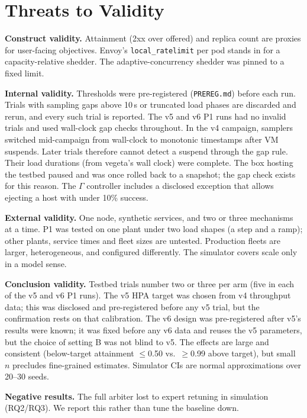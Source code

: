 \documentclass[conference]{IEEEtran}
\begin{document}
\section{Threats to Validity}
\label{sec:threats}

\textbf{Construct validity.} Attainment (2xx over offered) and replica count
are proxies for user-facing objectives. Envoy's \texttt{local\_ratelimit} per
pod stands in for a capacity-relative shedder. The adaptive-concurrency
shedder was pinned to a fixed limit.

\textbf{Internal validity.} Thresholds were pre-registered
(\texttt{PREREG.md}) before each run. Trials with sampling gaps above 10\,s or
truncated load phases are discarded and rerun, and every such
trial is reported. The v5 and v6 P1 runs had no invalid trials and used
wall-clock gap checks throughout. In the v4 campaign, samplers switched mid-campaign from
wall-clock to monotonic timestamps after VM suspends. Later trials therefore
cannot detect a suspend through the gap rule. Their load durations (from
vegeta's wall clock) were complete. The box hosting the testbed paused and was once rolled back to a
snapshot; the gap check exists for this reason. The $\Gamma$ controller
includes a disclosed exception that allows ejecting a host with under 10\%
success.

\textbf{External validity.} One node, synthetic services, and two or three
mechanisms at a time. P1 was tested on one plant under two load shapes (a
step and a ramp); other plants, service times and fleet sizes are untested. Production fleets are larger, heterogeneous, and
configured differently. The simulator covers scale only in a model sense.

\textbf{Conclusion validity.} Testbed trials number two or three per arm
(five in each of the v5 and v6 P1 runs). The v5 HPA target was chosen from
v4 throughput data; this was disclosed and pre-registered before any v5
trial, but the confirmation rests on that calibration. The v6 design was
pre-registered after v5's results were known; it was fixed before any v6
data and reuses the v5 parameters, but the choice of setting B was not
blind to v5. The effects are large and consistent (below-target attainment $\le$0.50 vs.\ $\ge$0.99 above target), but small $n$ precludes fine-grained
estimates. Simulator CIs are normal approximations over 20--30 seeds.

\textbf{Negative results.} The full arbiter lost to expert retuning in
simulation (RQ2/RQ3). We report this rather than tune the baseline down.
\end{document}
